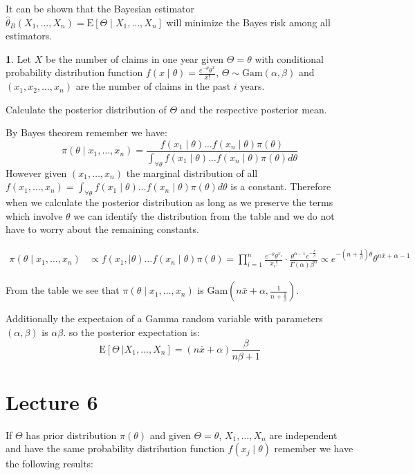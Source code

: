\documentclass[english,12pt]{article}
\theoremstyle{plain}
\theoremstyle{definition}
\newtheorem*{example}{\protect\examplename}
\theoremstyle{definition} %
\providecommand{\examplename}{Example}
\newcommand{\ex}[1]{\mbox{E} \left[ #1 \right]}
\newcommand{\condex}[2]{\mbox{E} \left[ \left. #1 \ \right\vert \left. #2 \right. \right]}
\begin{document}
It can be shown that the Bayesian estimator $\hat\theta_B(X_1,\ldots,X_n)=\ex{\Theta\mid X_1,\ldots,X_n}$ will minimize the Bayes risk among all estimators.

\begin{example}
Let $X$ be the number of claims in one year given $\Theta=\theta$ with conditional probability distribution function $f(x\mid\theta)=\frac{e^{-\theta}\theta^x}{x!}$, $\Theta\sim \text{Gam}(\alpha,\beta)$ and $(x_1,x_2,\ldots,x_n)$ are the number of claims in the past $i$ years.

Calculate the posterior distribution of $\Theta$ and the respective posterior mean.

By Bayes theorem remember we have:
\[\pi(\theta\mid x_1,\ldots,x_n)=\frac{f(x_1\mid\theta)\ldots f(x_n\mid\theta)\pi(\theta)}{\int_{\forall\theta}f(x_1\mid\theta)\ldots f(x_n\mid\theta)\pi(\theta)d\theta}\]
However given $(x_1,\ldots,x_n)$ the marginal distribution of all $f(x_1,\ldots,x_n)=\int_{\forall\theta}f(x_1\mid\theta)\ldots f(x_n\mid\theta)\pi(\theta)d\theta$ is a constant.  Therefore when we calculate the posterior distribution as long as we preserve the terms which involve $\theta$ we can identify the distribution from the table and we do not have to worry about the remaining constants.

\begin{align*}
\pi(\theta\mid x_1,\ldots, x_n)
&\propto f(x_1,\mid\theta)\ldots f(x_n\mid\theta)\pi(\theta)
=\prod_{i=1}^n\frac{e^{-\theta}\theta^{x_i}}{x_i!}\cdot\frac{\theta^{\alpha-1}e^{-\frac{\theta}{\beta}}}{\Gamma(\alpha)\beta^{\alpha}}
\propto e^{-\left(n+\frac{1}{\beta}\right)\theta}\theta^{n\bar{x}+\alpha-1}
\end{align*}

From the table we see that $\pi(\theta\mid x_1,\ldots,x_n)$ is $\text{Gam}\left(n\bar{x}+\alpha,\frac{1}{n+\frac{1}{\beta}}\right)$.

Additionally the expectaion of a Gamma random variable with parameters $(\alpha,\beta)$ is $\alpha\beta$.  so the posterior expectation is:
\[\condex{\Theta}{X_1,\ldots,X_n}=(n\bar{x}+\alpha)\frac{\beta}{n\beta+1}\]
\end{example}

\section*{Lecture 6}
If $\Theta$ has prior distribution $\pi(\theta)$ and given $\Theta=\theta$, $X_1,\ldots,X_n$ are independent and have the same probability distribution function $f(x_j\mid\theta)$ remember we have the following results:
\end{document}
